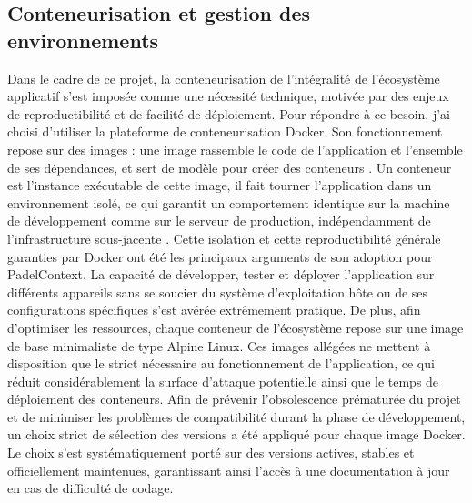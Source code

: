\documentclass[12pt]{article}
\begin{document}
\subsection{Conteneurisation et gestion des environnements}

Dans le cadre de ce projet, la conteneurisation de l'intégralité de l'écosystème applicatif s'est imposée comme une nécessité technique, motivée par des enjeux de reproductibilité et de facilité de déploiement. Pour répondre à ce besoin, j'ai choisi d'utiliser la plateforme de conteneurisation Docker.
\newline\newline
Son fonctionnement repose sur des images : une image rassemble le code de l'application et l'ensemble de ses dépendances, et sert de modèle pour créer des conteneurs \parencite{docker_what_2026}. Un conteneur est l'instance exécutable de cette image, il fait tourner l'application dans un environnement isolé, ce qui garantit un comportement identique sur la machine de développement comme sur le serveur de production, indépendamment de l'infrastructure sous-jacente \parencite{docker_what_2026-1}.
\newline\newline
Cette isolation et cette reproductibilité générale garanties par Docker ont été les principaux arguments de son adoption pour PadelContext. La capacité de développer, tester et déployer l'application sur différents appareils sans se soucier du système d'exploitation hôte ou de ses configurations spécifiques s'est avérée extrêmement pratique. 
\newline\newline
De plus, afin d'optimiser les ressources, chaque conteneur de l'écosystème repose sur une image de base minimaliste de type Alpine Linux. Ces images allégées ne mettent à disposition que le strict nécessaire au fonctionnement de l'application, ce qui réduit considérablement la surface d'attaque potentielle ainsi que le temps de déploiement des conteneurs.
\newline\newline
Afin de prévenir l'obsolescence prématurée du projet et de minimiser les problèmes de compatibilité durant la phase de développement, un choix strict de sélection des versions a été appliqué pour chaque image Docker. Le choix s'est systématiquement porté sur des versions actives, stables et officiellement maintenues, garantissant ainsi l'accès à une documentation à jour en cas de difficulté de codage.
\newline\newline
\end{document}
